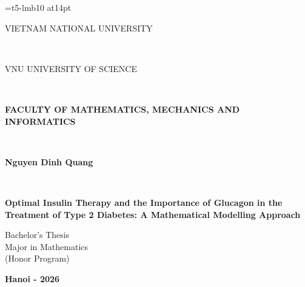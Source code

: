 \documentclass[13pt, a4paper, oneside]{book}
\numberwithin{subsection}{section}
\begin{document}
\font\chuong=t5-lmb10 at14pt%
\fontsize{14pt}{14pt}\selectfont%

\thispagestyle{empty}
\thisfancypage{\fboxrule=8\fboxrule
	\fboxsep=2\fboxsep
\fbox}{}
\begin{center}
\begin{large}
{\fontsize{13pt}{1}\selectfont VIETNAM NATIONAL UNIVERSITY}
\end{large} \\
\begin{large}
{\fontsize{13pt}{1}\selectfont VNU UNIVERSITY OF SCIENCE}
\end{large} \\
\begin{large}
{\fontsize{13pt}{1}\selectfont \textbf{FACULTY OF MATHEMATICS, MECHANICS AND INFORMATICS}}
\end{large} \\
\vspace{3 cm}
\begin{large}
{\fontsize{14pt}{1}\selectfont \textbf{Nguyen Dinh Quang}}
\end{large} \\
\end{center}

\vspace{3.5 cm}
\begin{center}
\fontsize{16pt}{1}\selectfont\textbf{Optimal Insulin Therapy and the Importance of Glucagon in the Treatment of  Type 2 Diabetes: A Mathematical Modelling Approach}
\vspace{4 cm}
\end{center}
\begin{center}
{\fontsize{14pt}{1}\selectfont Bachelor’s Thesis \\
Major in Mathematics \\
(Honor Program)}
\end{center}
\vspace{6 cm}

\begin{center} 
{\fontsize{14pt}{1}\selectfont \textbf{Hanoi - 2026}}
\end{center}
\end{document}
